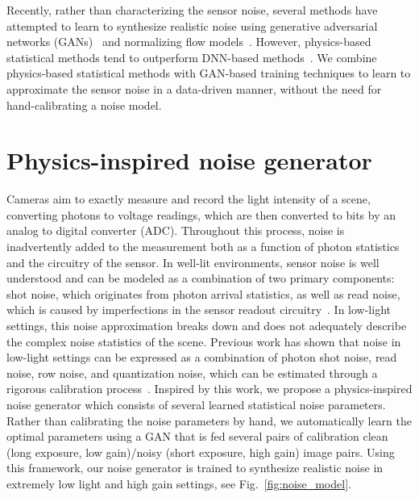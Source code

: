 \documentclass[final]{cvpr}
\begin{document}
Recently, rather than characterizing the sensor noise, several methods have attempted to learn to synthesize realistic noise using generative adversarial networks (GANs)~\cite{chen2018image, tran2020gan} and normalizing flow models~\cite{abdelhamed2019noise}. However, physics-based statistical methods tend to outperform DNN-based methods~\cite{zhang2021rethinking}. We combine physics-based statistical methods with GAN-based training techniques to learn to approximate the sensor noise in a data-driven manner, without the need for hand-calibrating a noise model. 











\section{Physics-inspired noise generator}
\label{sec:generator}
Cameras aim to exactly measure and record the light intensity of a scene, converting photons to voltage readings, which are then converted to bits by an analog to digital converter (ADC). Throughout this process, noise is inadvertently added to the measurement both as a function of photon statistics and the circuitry of the sensor. In well-lit environments, sensor noise is well understood and can be modeled as a combination of two primary components: shot noise, which originates from photon arrival statistics, as well as read noise, which is caused by imperfections in the sensor readout circuitry~\cite{hasinoff2014photon}. In low-light settings, this noise approximation breaks down and does not adequately describe the complex noise statistics of the scene. Previous work has shown that noise in low-light settings can be expressed as a combination of photon shot noise, read noise, row noise, and quantization noise, which can be estimated through a rigorous calibration process~\cite{wei2020physics}. Inspired by this work, we propose a physics-inspired noise generator which consists of several learned statistical noise parameters. Rather than calibrating the noise parameters by hand, we automatically learn the optimal parameters using a GAN that is fed several pairs of calibration clean (long exposure, low gain)/noisy (short exposure, high gain) image pairs. Using this framework, our noise generator is trained to synthesize realistic noise in extremely low light and high gain settings, see Fig.~\ref{fig:noise_model}. 
\end{document}
